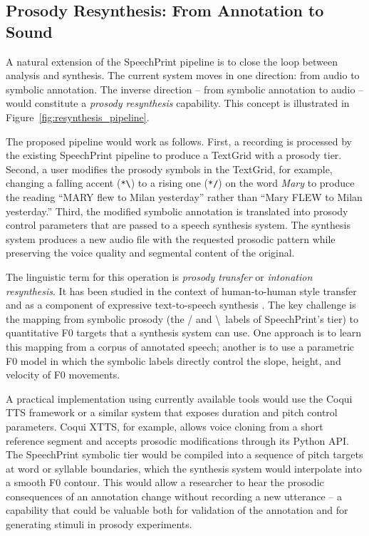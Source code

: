 \subsection{Prosody Resynthesis: From Annotation to Sound}
\label{sec:resynthesis}

A natural extension of the SpeechPrint pipeline is to close the loop between
analysis and synthesis. The current system moves in one direction: from audio
to symbolic annotation. The inverse direction -- from symbolic annotation to
audio -- would constitute a \emph{prosody resynthesis} capability. This concept
is illustrated in Figure~\ref{fig:resynthesis_pipeline}.

The proposed pipeline would work as follows. First, a recording is processed by
the existing SpeechPrint pipeline to produce a TextGrid with a prosody tier.
Second, a user modifies the prosody symbols in the TextGrid, for example,
changing a falling accent (\texttt{*\textbackslash}) to a rising one
(\texttt{*/}) on the word \textit{Mary} to produce the reading ``MARY flew to
Milan yesterday'' rather than ``Mary FLEW to Milan yesterday.'' Third, the
modified symbolic annotation is translated into prosody control parameters that
are passed to a speech synthesis system. The synthesis system produces a new
audio file with the requested prosodic pattern while preserving the voice quality
and segmental content of the original.

The linguistic term for this operation is \emph{prosody transfer} or
\emph{intonation resynthesis}. It has been studied in the context of
human-to-human style transfer and as a component of expressive text-to-speech
synthesis \cite{skerry2018towards}. The key challenge is the mapping from
symbolic prosody (the / and \textbackslash\ labels of SpeechPrint's tier) to
quantitative F0 targets that a synthesis system can use. One approach is to
learn this mapping from a corpus of annotated speech; another is to use a
parametric F0 model in which the symbolic labels directly control the slope,
height, and velocity of F0 movements.

A practical implementation using currently available tools would use the
Coqui TTS framework or a similar system that exposes duration and pitch control
parameters. Coqui XTTS, for example, allows voice cloning from a short reference
segment and accepts prosodic modifications through its Python API. The SpeechPrint
symbolic tier would be compiled into a sequence of pitch targets at word or
syllable boundaries, which the synthesis system would interpolate into a smooth
F0 contour. This would allow a researcher to hear the prosodic consequences of an
annotation change without recording a new utterance -- a capability that could be
valuable both for validation of the annotation and for generating stimuli in
prosody experiments.

